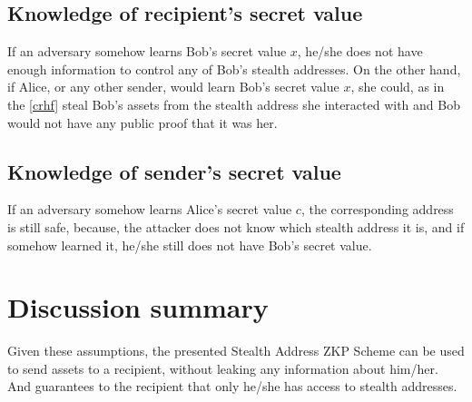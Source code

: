\subsection{Knowledge of recipient's secret value}

If an adversary somehow learns Bob's secret value $x$, he/she does not have enough
information to control any of Bob's stealth addresses. On the other hand, if Alice,
or any other sender, would learn Bob's secret value $x$, she could, as in the
\ref{crhf} steal Bob's assets from the stealth address she interacted with and
Bob would not have any public proof that it was her.

\subsection{Knowledge of sender's secret value}

If an adversary somehow learns Alice's secret value $c$, the corresponding
address is still safe, because, the attacker does not know which stealth address
it is, and if somehow learned it, he/she still does not have Bob's secret value.

\section{Discussion summary}

Given these assumptions, the presented Stealth Address ZKP Scheme can be used to
send assets to a recipient, without leaking any information about him/her. And
guarantees to the recipient that only he/she has access to stealth addresses.

